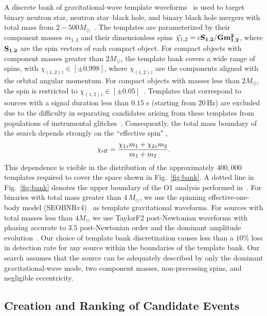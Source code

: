 A discrete bank of gravitational-wave template waveforms~\citep{Owen:1995tm,Owen:1998dk,Brown:2012qf} is used to target binary neutron star,
neutron star--black hole, and binary black hole mergers with total mass from $2-500 M_{\odot}$~\citep{DalCanton:2017ala}. The templates are
parameterized by their component masses $m_{1,2}$ and their dimensionless spins  $\vec{\chi}_{1,2} = c \bf{S}_{1,2}/G m_{1,2}^2$, where
$\bf{S}_{1,2}$ are the spin vectors of each compact object.  For compact objects with component
masses greater than $2 M_{\odot}$, the template bank covers a wide range of spins, with $\chi_{(1,2)z} \in [\pm 0.998]$, where $\chi_{(1,2)z}$ are the components aligned with the orbital angular momentum. For compact objects
with masses less than  $2 M_{\odot}$, the spin is restricted to $\chi_{(1,2)z} \in [\pm 0.05]$~\citep{Brown:2012qf}. Templates that correspond
to sources with a signal duration less than $0.15$ s (starting from $20\,$Hz) are excluded due to the difficulty in separating candidates arising from
these templates from populations of instrumental glitches~\citep{DalCanton:2017ala}. Consequently, the total mass boundary of the search
depends strongly on the ``effective spin" \citep{Racine:2008qv, Ajith:2009bn},
%
\begin{equation}\label{eq:chi_effective}
\chi_{\mathrm{eff}} = \frac{\chi_{1z} m_1 + \chi_{2z} m_2}{m_1+m_2}.
\end{equation}
%
This dependence is visible in the distribution of the approximately $400,000$ templates required to cover the space shown in Fig.~\ref{fig:bank}. A dotted line in Fig.~\ref{fig:bank} denotes the upper boundary of the O1 analysis performed in~\cite{TheLIGOScientific:2016pea}. For binaries with total mass greater than $4\,M_\odot$, we use the spinning effective-one-body model (SEOBNRv4)~\citep{Taracchini:2013,Bohe:2016gbl} as template gravitational waveforms. For sources with total masses less than $4M_{\odot}$ we use TaylorF2 post-Newtonian waveforms with phasing accurate to $3.5$ post-Newtonian order and the dominant amplitude evolution~\citep{Sathyaprakash:1991mt,Droz:1999qx,Blanchet:2002av,Faye:2012we}. Our choice of template bank discretization causes less than a $10\%$ loss in detection rate for any source within the boundaries of the template bank. Our search assumes that the source can be adequately described by only the dominant gravitational-wave mode, two component masses, non-precessing spins, and negligible eccentricity.

\subsection{Creation and Ranking of Candidate Events}

